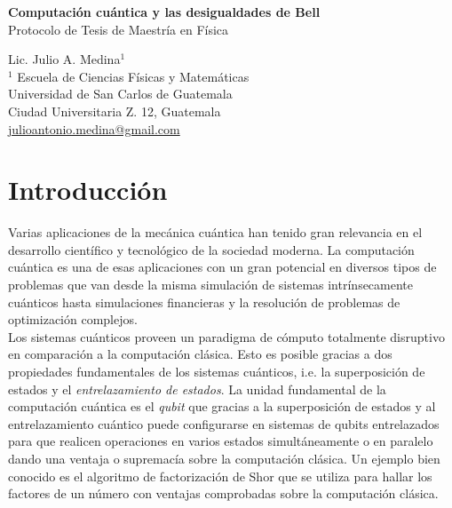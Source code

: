 \documentclass[a4paper]{article}
\begin{document}

\Large
 \begin{center}
\textbf{Computación cuántica y las desigualdades de Bell}\\
Protocolo de Tesis de Maestría en Física

\hspace{10pt}

\large
Lic. Julio A. Medina$^1$ \\

\hspace{10pt}
\small  
$^1$ Escuela de Ciencias Físicas y Matemáticas\\
Universidad de San Carlos de Guatemala\\ Ciudad Universitaria Z. 12, Guatemala\\


\href{mailto:julioantonio.medina@gmail.com}{julioantonio.medina@gmail.com}\\

\end{center}

\hspace{10pt}


\normalsize



\section{Introducción}
Varias aplicaciones de la mecánica cuántica han tenido gran relevancia en el desarrollo científico y tecnológico de la sociedad moderna. La computación cuántica es una de esas aplicaciones con un gran potencial en diversos tipos de problemas que van desde la misma simulación de sistemas intrínsecamente cuánticos hasta simulaciones financieras y la resolución de problemas de optimización complejos. \\

Los sistemas cuánticos proveen un paradigma de cómputo totalmente disruptivo en comparación a la computación clásica. Esto es posible gracias a dos propiedades fundamentales de los sistemas cuánticos, i.e. la superposición de estados y el \emph{entrelazamiento de estados}. La unidad fundamental de la computación cuántica es el \emph{qubit} que gracias a la superposición de estados y al entrelazamiento cuántico puede configurarse en sistemas de qubits entrelazados para que realicen operaciones en varios estados simultáneamente o en paralelo dando una ventaja o supremacía sobre la computación clásica. Un ejemplo bien conocido es el algoritmo de factorización de Shor\cite{Shor} que se utiliza para hallar los factores de un número con ventajas comprobadas sobre la computación clásica.
\end{document}
